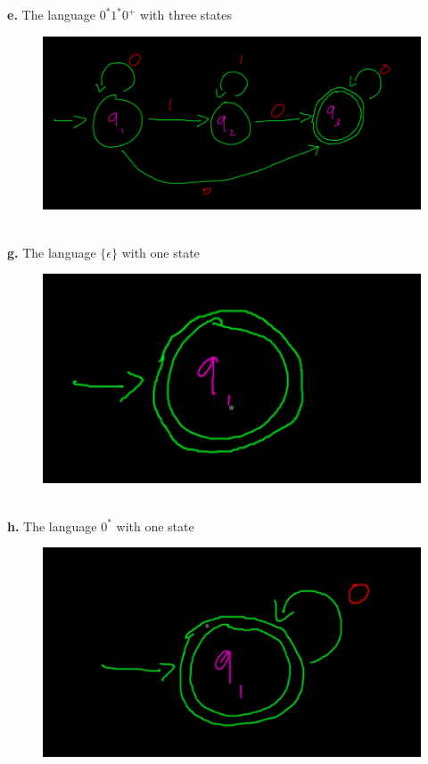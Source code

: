 \documentclass[letter]{article}
\theoremstyle{case}
\begin{document}
\textbf{e. } The language $0^*1^*0^+$ with three states\\
\begin{figure}[h!]
	\includegraphics[scale=0.4]{7e.png}
\end{figure} \\
\textbf{g. } The language $\{\epsilon\}$ with one state\\
\begin{figure}[h!]
	\includegraphics[scale=0.4]{7g.png}
\end{figure} \\
\textbf{h. } The language $0^*$ with one state\\
\begin{figure}[h!]
	\includegraphics[scale=0.4]{7h.png}
\end{figure} \\
\newpage
\end{document}
